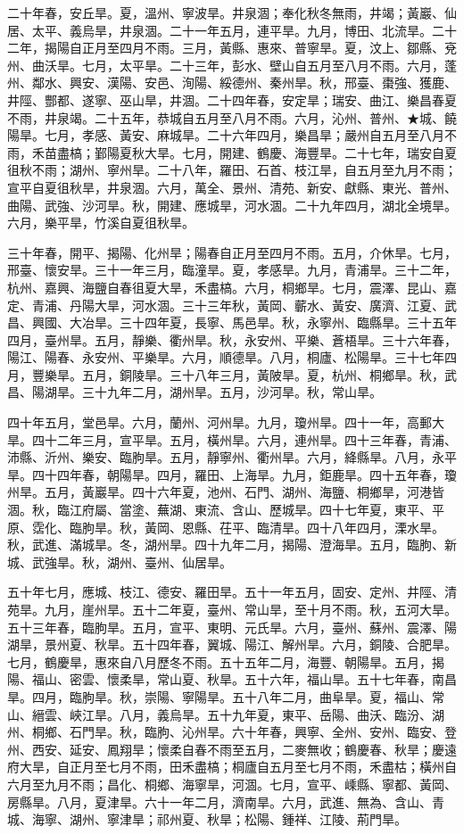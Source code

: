 \begin{pinyinscope}
二十年春，安丘旱。夏，溫州、寧波旱。井泉涸；奉化秋冬無雨，井竭；黃巖、仙居、太平、義烏旱，井泉涸。二十一年五月，連平旱。九月，博田、北流旱。二十二年，揭陽自正月至四月不雨。三月，黃縣、惠來、普寧旱。夏，汶上、鄒縣、兗州、曲沃旱。七月，太平旱。二十三年，彭水、壁山自五月至八月不雨。六月，蓬州、鄰水、興安、漢陽、安邑、洵陽、綏德州、秦州旱。秋，邢臺、棗強、獲鹿、井陘、酆都、遂寧、巫山旱，井涸。二十四年春，安定旱；瑞安、曲江、樂昌春夏不雨，井泉竭。二十五年，恭城自五月至八月不雨。六月，沁州、普州、★城、饒陽旱。七月，孝感、黃安、麻城旱。二十六年四月，樂昌旱；嚴州自五月至八月不雨，禾苗盡槁；鄞陽夏秋大旱。七月，開建、鶴慶、海豐旱。二十七年，瑞安自夏徂秋不雨；湖州、寧州旱。二十八年，羅田、石首、枝江旱，自五月至九月不雨；宣平自夏徂秋旱，井泉涸。六月，萬全、景州、清苑、新安、獻縣、東光、普州、曲陽、武強、沙河旱。秋，開建、應城旱，河水涸。二十九年四月，湖北全境旱。六月，樂平旱，竹溪自夏徂秋旱。

三十年春，開平、揭陽、化州旱；陽春自正月至四月不雨。五月，介休旱。七月，邢臺、懷安旱。三十一年三月，臨潼旱。夏，孝感旱。九月，青浦旱。三十二年，杭州、嘉興、海鹽自春徂夏大旱，禾盡槁。六月，桐鄉旱。七月，震澤、昆山、嘉定、青浦、丹陽大旱，河水涸。三十三年秋，黃岡、蘄水、黃安、廣濟、江夏、武昌、興國、大冶旱。三十四年夏，長寧、馬邑旱。秋，永寧州、臨縣旱。三十五年四月，臺州旱。五月，靜樂、衢州旱。秋，永安州、平樂、蒼梧旱。三十六年春，陽江、陽春、永安州、平樂旱。六月，順德旱。八月，桐廬、松陽旱。三十七年四月，豐樂旱。五月，銅陵旱。三十八年三月，黃陂旱。夏，杭州、桐鄉旱。秋，武昌、陽湖旱。三十九年二月，湖州旱。五月，沙河旱。秋，常山旱。

四十年五月，堂邑旱。六月，蘭州、河州旱。九月，瓊州旱。四十一年，高郵大旱。四十二年三月，宣平旱。五月，橫州旱。六月，連州旱。四十三年春，青浦、沛縣、沂州、樂安、臨朐旱。五月，靜寧州、衢州旱。六月，絳縣旱。八月，永平旱。四十四年春，朝陽旱。四月，羅田、上海旱。九月，鉅鹿旱。四十五年春，瓊州旱。五月，黃巖旱。四十六年夏，池州、石門、湖州、海鹽、桐鄉旱，河港皆涸。秋，臨江府屬、當塗、蕪湖、東流、含山、歷城旱。四十七年夏，東平、平原、霑化、臨朐旱。秋，黃岡、恩縣、茌平、臨清旱。四十八年四月，溧水旱。秋，武進、滿城旱。冬，湖州旱。四十九年二月，揭陽、澄海旱。五月，臨朐、新城、武強旱。秋，湖州、臺州、仙居旱。

五十年七月，應城、枝江、德安、羅田旱。五十一年五月，固安、定州、井陘、清苑旱。九月，崖州旱。五十二年夏，臺州、常山旱，至十月不雨。秋，五河大旱。五十三年春，臨朐旱。五月，宣平、東明、元氏旱。六月，臺州、蘇州、震澤、陽湖旱，景州夏、秋旱。五十四年春，翼城、陽江、解州旱。六月，銅陵、合肥旱。七月，鶴慶旱，惠來自八月歷冬不雨。五十五年二月，海豐、朝陽旱。五月，揭陽、福山、密雲、懷柔旱，常山夏、秋旱。五十六年，福山旱。五十七年春，南昌旱。四月，臨朐旱。秋，崇陽、寧陽旱。五十八年二月，曲阜旱。夏，福山、常山、縉雲、峽江旱。八月，義烏旱。五十九年夏，東平、岳陽、曲沃、臨汾、湖州、桐鄉、石門旱。秋，臨朐、沁州旱。六十年春，興寧、全州、安州、臨安、登州、西安、延安、鳳翔旱；懷柔自春不雨至五月，二麥無收；鶴慶春、秋旱；慶遠府大旱，自正月至七月不雨，田禾盡槁；桐廬自五月至七月不雨，禾盡枯；橫州自六月至九月不雨；昌化、桐鄉、海寧旱，河涸。七月，宣平、嵊縣、寧都、黃岡、房縣旱。八月，夏津旱。六十一年二月，濟南旱。六月，武進、無為、含山、青城、海寧、湖州、寧津旱；祁州夏、秋旱；松陽、鍾祥、江陵、荊門旱。


\end{pinyinscope}
